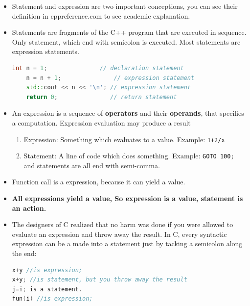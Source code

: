 \documentclass[a4paper,11pt,twoside]{book}
\begin{document}
\begin{itemize}
    \item Statement and expression are two important conceptions, you can see their definition in cppreference.com to see academic explanation.
    
    \item Statements are fragments of the C++ program that are executed in sequence. Only statement, which end with semicolon is executed. Most statements are expression statements. 
\begin{lstlisting}[frame=single, language=c++]    
	int n = 1;               // declaration statement
	n = n + 1;               // expression statement
	std::cout << n << '\n'; // expression statement
	return 0;               // return statement
\end{lstlisting}
	\item An expression is a sequence of \textbf{operators} and their \textbf{operands}, that specifies a computation. Expression evaluation may produce a result

    \begin{enumerate}
    	\item Expression: Something which evaluates to a value. Example: \texttt{1+2/x}
    	\item Statement: A line of code which does something. Example: \texttt{GOTO 100;} and statements are all end with semi-comma.
    \end{enumerate}

    \item Function call is a expression, because it can yield a value.
    
    \item \textbf{All expressions yield a value, So expression is a value, statement is an action.}
    

    \item The designers of C realized that no harm was done if you were allowed to evaluate an expression and throw away the result. In C, every syntactic expression can be a made into a statement just by tacking a semicolon along the end:
    
\begin{lstlisting}[frame=single, language=c++]
x+y //is expression;
x+y; //is statement, but you throw away the result
j=i; is a statement.
fun(i) //is expression;
\end{lstlisting}
    
\end{itemize}
\end{document}
